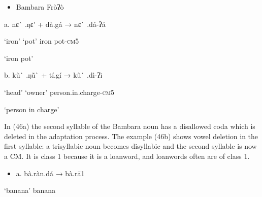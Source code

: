 \begin{itemize}
\item \begin{styleindexi}
       Bambara                                Fròʔò\label{bkm:Ref486356985}
\end{styleindexi}\end{itemize}
\begin{styleindexi}
          a. nɛ\`{} .ŋɛ\'{}      +     dà.gá            →           nɛ\`{} .dá-ʔá 
\end{styleindexi}

\begin{styleindexi}
               ‘iron’            ‘pot’                       iron pot-\textsc{cm}5    
\end{styleindexi}

\begin{styleindexi}
                                                          ‘iron pot’      
\end{styleindexi}

\begin{styleindexi}
          b. kũ\`{} .ŋũ\`{}    +     tí.gí              →          kũ\`{} .dì-ʔì
\end{styleindexi}

\begin{styleindexi}
                ‘head’           ‘owner’                     person.in.charge-\textsc{cm}5
\end{styleindexi}

\begin{styleindexi}
                                                          ‘person in charge’           
\end{styleindexi}

In (46a) the second syllable of the Bambara noun has a disallowed coda which is deleted in the adaptation process. The example (46b) shows vowel deletion in the first syllable: a trisyllabic noun becomes disyllabic and the second syllable is now a CM. It is class 1 because it is a loanword, and loanwords often are of class 1.

\begin{itemize}
\item \begin{styleindexi}
   a.       bà.ràn.dá          →          bà.rā1
\end{styleindexi}\end{itemize}
\begin{styleindexi}
                    ‘banana’                        banana
\end{styleindexi}


